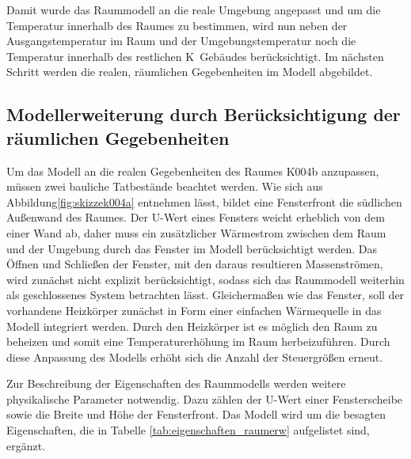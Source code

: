 Damit wurde das Raummodell an die reale Umgebung angepasst und um die Temperatur innerhalb des Raumes zu bestimmen, wird nun neben der Ausgangstemperatur im Raum und der Umgebungstemperatur noch die Temperatur innerhalb des restlichen K~Gebäudes berücksichtigt. Im nächsten Schritt werden die realen, räumlichen Gegebenheiten im Modell abgebildet.


\subsection{Modellerweiterung durch Berücksichtigung der räumlichen Gegebenheiten}

Um das Modell an die realen Gegebenheiten des Raumes K004b anzupassen, müssen zwei bauliche Tatbestände beachtet werden. Wie sich aus Abbildung\ref{fig:skizzek004a} entnehmen lässt, bildet eine Fensterfront die südlichen Außenwand des Raumes. Der U-Wert eines Fensters weicht erheblich von dem einer Wand ab, daher muss ein zusätzlicher Wärmestrom zwischen dem Raum und der Umgebung durch das Fenster im Modell berücksichtigt werden. Das Öffnen und Schließen der Fenster, mit den daraus resultieren Massenströmen, wird zunächst nicht explizit berücksichtigt, sodass  sich das Raummodell weiterhin als geschlossenes System betrachten lässt. 
Gleichermaßen wie das Fenster, soll der vorhandene Heizkörper zunächst in Form einer einfachen Wärmequelle in das Modell integriert werden. Durch den Heizkörper ist es möglich den Raum zu beheizen und somit eine Temperaturerhöhung im Raum herbeizuführen. Durch diese Anpassung des Modells erhöht sich die Anzahl der Steuergrößen erneut. 

Zur Beschreibung der Eigenschaften des Raummodells werden weitere physikalische Parameter notwendig. Dazu zählen der U-Wert einer Fensterscheibe sowie die Breite und Höhe der Fensterfront. Das Modell wird um die besagten Eigenschaften, die in Tabelle \ref{tab:eigenschaften_raumerw} aufgelistet sind, ergänzt.

